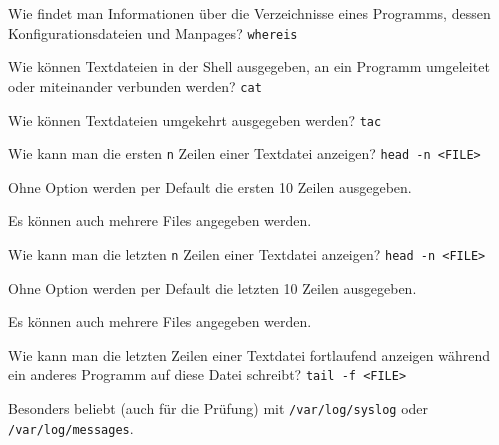 \begin{flashcard}[Command]{Wie findet man Informationen über die Verzeichnisse eines Programms, dessen Konfigurationsdateien und Manpages?}
	\texttt{whereis}
	
	
\end{flashcard}

\begin{flashcard}[Command]{Wie können Textdateien in der Shell ausgegeben, an ein Programm umgeleitet oder miteinander verbunden werden?}
	\texttt{cat}
	
	
\end{flashcard}

\begin{flashcard}[Command]{Wie können Textdateien umgekehrt ausgegeben werden?}
	\texttt{tac}
\end{flashcard}

\begin{flashcard}[Command]{Wie kann man die ersten \texttt{n} Zeilen einer Textdatei anzeigen?}
	\texttt{head -n  <FILE>}
	
	Ohne Option werden per Default die ersten 10 Zeilen ausgegeben.
	
	Es können auch mehrere Files angegeben werden.
	
	
\end{flashcard}

\begin{flashcard}[Command]{Wie kann man die letzten \texttt{n} Zeilen einer Textdatei anzeigen?}
	\texttt{head -n  <FILE>}
	
	Ohne Option werden per Default die letzten 10 Zeilen ausgegeben.
	
	Es können auch mehrere Files angegeben werden.
	
	
\end{flashcard}

\begin{flashcard}[Command]{Wie kann man die letzten Zeilen einer Textdatei fortlaufend anzeigen während ein anderes Programm auf diese Datei schreibt?}
	\texttt{tail -f <FILE>}
	
	Besonders beliebt (auch für die Prüfung) mit \texttt{/var/log/syslog} oder \texttt{/var/log/messages}.
\end{flashcard}

